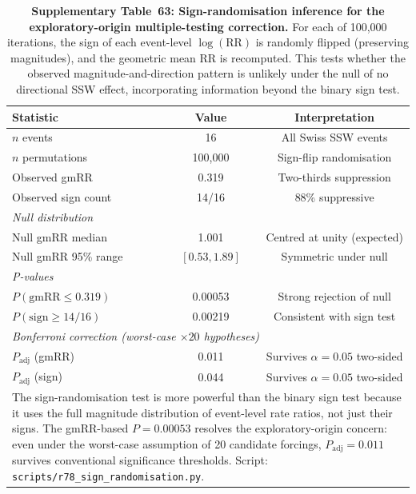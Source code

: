 \documentclass[11pt,letterpaper]{article}
\begin{document}
\begin{table}[!ht]
\centering
\caption{\textbf{Supplementary Table~63: Sign-randomisation inference for the exploratory-origin multiple-testing correction.}
For each of 100,000 iterations, the sign of each event-level $\log(\mathrm{RR})$ is randomly flipped (preserving magnitudes), and the geometric mean RR is recomputed. This tests whether the observed magnitude-and-direction pattern is unlikely under the null of no directional SSW effect, incorporating information beyond the binary sign test.}
\label{tab:randomisation}
\small
\begin{tabular}{lcc}
\toprule
Statistic & Value & Interpretation \\
\midrule
$n$ events & 16 & All Swiss SSW events \\
$n$ permutations & 100,000 & Sign-flip randomisation \\
Observed gmRR & 0.319 & Two-thirds suppression \\
Observed sign count & 14/16 & 88\% suppressive \\
\midrule
\multicolumn{3}{l}{\textit{Null distribution}} \\
Null gmRR median & 1.001 & Centred at unity (expected) \\
Null gmRR 95\% range & $[0.53, 1.89]$ & Symmetric under null \\
\midrule
\multicolumn{3}{l}{\textit{P-values}} \\
$P(\mathrm{gmRR} \leq 0.319)$ & 0.00053 & Strong rejection of null \\
$P(\mathrm{sign} \geq 14/16)$ & 0.00219 & Consistent with sign test \\
\midrule
\multicolumn{3}{l}{\textit{Bonferroni correction (worst-case $\times 20$ hypotheses)}} \\
$P_{\mathrm{adj}}$ (gmRR) & 0.011 & Survives $\alpha = 0.05$ two-sided \\
$P_{\mathrm{adj}}$ (sign) & 0.044 & Survives $\alpha = 0.05$ two-sided \\
\bottomrule
\multicolumn{3}{p{12cm}}{\footnotesize The sign-randomisation test is more powerful than the binary sign test because it uses the full magnitude distribution of event-level rate ratios, not just their signs. The gmRR-based $P = 0.00053$ resolves the exploratory-origin concern: even under the worst-case assumption of 20 candidate forcings, $P_{\mathrm{adj}} = 0.011$ survives conventional significance thresholds. Script: \texttt{scripts/r78\_sign\_randomisation.py}.} \\
\end{tabular}
\end{table}
\end{document}
